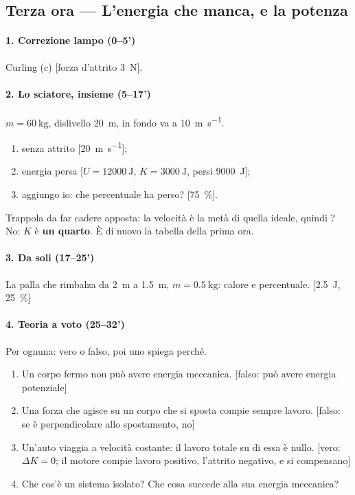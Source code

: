 \documentclass[11pt]{report}
\begin{document}
\subsection*{Terza ora --- L'energia che manca, e la potenza}

\paragraph{1. Correzione lampo (0--5')}
Curling (c) [forza d'attrito \SI{3}{\newton}].

\paragraph{2. Lo sciatore, insieme (5--17')}
$m=\SI{60}{\kilogram}$, dislivello \SI{20}{\metre}, in fondo va a \SI{10}{\metre\per\second}.
\begin{enumerate}
  \item senza attrito [\SI{20}{\metre\per\second}];
  \item energia persa [$U=\SI{12000}{\joule}$, $K=\SI{3000}{\joule}$, persi \SI{9000}{\joule}];
  \item aggiungo io: che percentuale ha perso? [\SI{75}{\percent}].
\end{enumerate}
Trappola da far cadere apposta: la velocità è la metà di quella ideale, quindi ? No: $K$ è \textbf{un quarto}. È di nuovo la tabella della prima ora.

\paragraph{3. Da soli (17--25')}
La palla che rimbalza da \SI{2}{\metre} a \SI{1.5}{\metre}, $m=\SI{0.5}{\kilogram}$: calore e percentuale. [\SI{2.5}{\joule}, \SI{25}{\percent}]

\paragraph{4. Teoria a voto (25--32')}
Per ognuna: vero o falso, poi uno spiega perché.
\begin{enumerate}
  \item Un corpo fermo non può avere energia meccanica. [falso: può avere energia potenziale]
  \item Una forza che agisce su un corpo che si sposta compie sempre lavoro. [falso: se è perpendicolare allo spostamento, no]
  \item Un'auto viaggia a velocità costante: il lavoro totale su di essa è nullo. [vero: $\Delta K=0$; il motore compie lavoro positivo, l'attrito negativo, e si compensano]
  \item Che cos'è un sistema isolato? Che cosa succede alla sua energia meccanica?
\end{enumerate}
\end{document}
